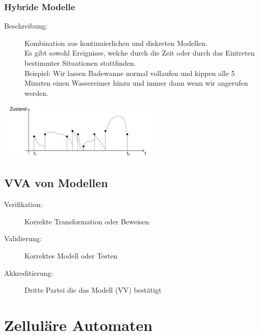 \documentclass[11pt, fleqn, a4paper, leqno]{scrartcl} %
\begin{document}
		\subsubsection{Hybride Modelle}
			\begin{description}
				\item[Beschreibung:] Kombination aus kontinuierlichen und diskreten Modellen.\\
				Es gibt sowohl Ereignisse, welche durch die Zeit oder durch das Eintreten bestimmter Situationen stattfinden.\\
				Beispiel: Wir lassen Badewanne normal vollaufen und kippen alle 5 Minuten einen Wassereimer hinzu und immer dann wenn wir angerufen werden.
			\end{description}
			\begin{center}
				\includegraphics [scale=0.6]{images/hybrid.jpg}
			\end{center}
	\subsection{VVA von Modellen}
		\begin{description}
			\item[Verifikation:] Korrekte Transformation oder Beweisen
			\item[Validierung:] Korrektes Modell oder Testen
			\item[Akkreditierung:] Dritte Partei die das Modell (VV) bestätigt
		\end{description}
\section{Zelluläre Automaten}
\end{document}
